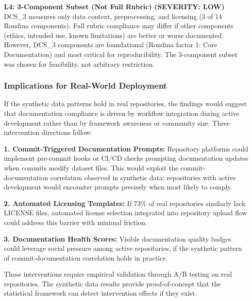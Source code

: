 \textbf{L4: 3-Component Subset (Not Full Rubric) (SEVERITY: LOW)}  
DCS\_3 measures only data context, preprocessing, and licensing (3 of 14 Rondina components). Full rubric compliance may differ if other components (ethics, intended use, known limitations) are better or worse documented. However, DCS\_3 components are foundational (Rondina factor 1: Core Documentation) and most critical for reproducibility. The 3-component subset was chosen for feasibility, not arbitrary restriction.

\subsubsection{Implications for Real-World Deployment}

If the synthetic data patterns hold in real repositories, the findings would suggest that documentation compliance is driven by workflow integration during active development rather than by framework awareness or community size. Three intervention directions follow:

\textbf{1. Commit-Triggered Documentation Prompts:} Repository platforms could implement pre-commit hooks or CI/CD checks prompting documentation updates when commits modify dataset files. This would exploit the commit-documentation correlation observed in synthetic data: repositories with active development would encounter prompts precisely when most likely to comply.

\textbf{2. Automated Licensing Templates:} If 73\% of real repositories similarly lack LICENSE files, automated license selection integrated into repository upload flow could address this barrier with minimal friction.

\textbf{3. Documentation Health Scores:} Visible documentation quality badges could leverage social pressure among active repositories, if the synthetic pattern of commit-documentation correlation holds in practice.

These interventions require empirical validation through A/B testing on real repositories. The synthetic data results provide proof-of-concept that the statistical framework can detect intervention effects if they exist.
